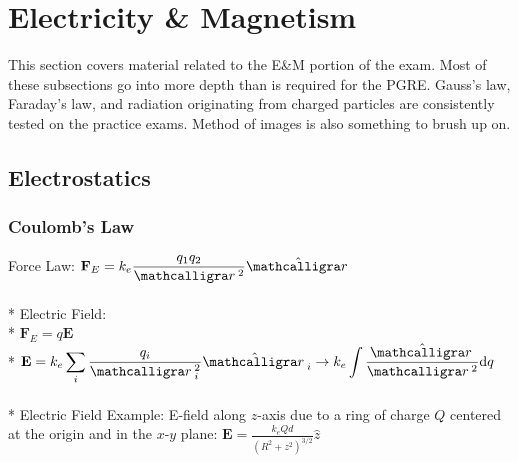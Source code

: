 \section{Electricity \& Magnetism}

This section covers material related to the E\&M portion of the exam.
Most of these subsections go into more depth than is required for the PGRE.
Gauss's law, Faraday's law, and radiation originating from charged particles are consistently tested on the practice exams.
Method of images is also something to brush up on.

\subsection{Electrostatics}

\subsubsection{Coulomb's Law}
Force Law: \(\displaystyle\mathbf{F}_E=k_e\frac{q_1q_2}{\scriptr^2}\hat{\scriptr}\)\\\\*
Electric Field:\\*
\(\displaystyle\mathbf{F}_E=q\mathbf{E}\)\\*
\(\displaystyle\mathbf{E}=k_e\sum_i\frac{q_i}{\scriptr_i^2}\hat{\scriptr}_i\to k_e\int\frac{\hat{\scriptr}}{\scriptr^2}\mathrm{d}q\)\\\\*
Electric Field Example: E-field along \(z\)-axis due to a ring of charge \(Q\) centered at the origin and in the \(x\)-\(y\) plane: \(\displaystyle\mathbf{E}=\frac{k_eQd}{(R^2+z^2)^{3/2}}\hat{z}\)

